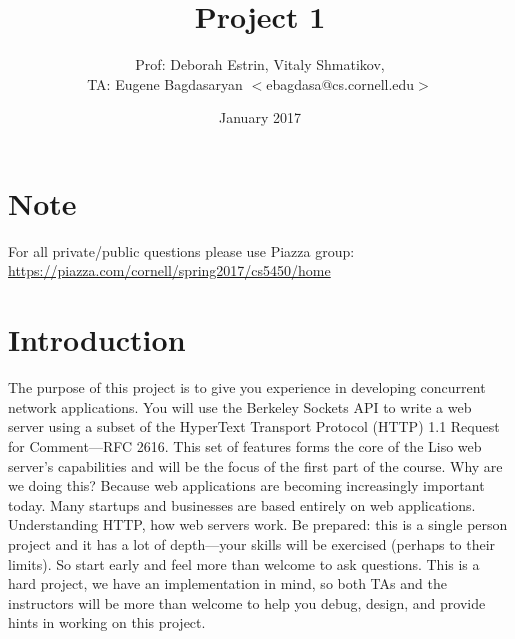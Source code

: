 \documentclass[12pt]{article}
\title{Project 1}
\author{Prof: Deborah Estrin, Vitaly Shmatikov, \\ TA: Eugene Bagdasaryan $<$ebagdasa@cs.cornell.edu$>$ \\ }
\date{January 2017}
\begin{document}
\maketitle

\section{Note}

For all private/public questions please use Piazza group: \url{https://piazza.com/cornell/spring2017/cs5450/home}

\section{Introduction}
The purpose of this project is to give you experience in developing concurrent network applications. You will use the Berkeley Sockets API to write a web server using a subset of the HyperText Transport Protocol (HTTP) 1.1 Request for Comment—RFC 2616. This set of features forms the core of the Liso web server’s capabilities and will be the focus of the first part of the course.
Why are we doing this? Because web applications are becoming increasingly important today. Many startups and businesses are based entirely on web applications. Understanding HTTP, how web servers work.
Be prepared: this is a single person project and it has a lot of depth—your skills will be exercised (perhaps to their limits). So start early and feel more than welcome to ask questions. This is a hard project, we have an implementation in mind, so both TAs and the instructors will be more than welcome to help you debug, design, and provide hints in working on this project.
\end{document}

